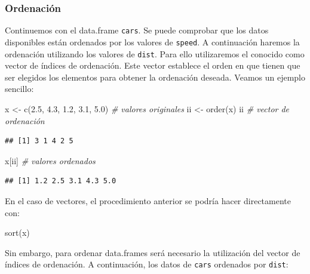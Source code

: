 \documentclass[
]{book}
\newenvironment{Shaded}{\begin{snugshade}}{\end{snugshade}}
\newcommand{\CommentTok}[1]{\textcolor[rgb]{0.56,0.35,0.01}{\textit{#1}}}
\newcommand{\FloatTok}[1]{\textcolor[rgb]{0.00,0.00,0.81}{#1}}
\newcommand{\FunctionTok}[1]{\textcolor[rgb]{0.00,0.00,0.00}{#1}}
\newcommand{\NormalTok}[1]{#1}
\newcommand{\OtherTok}[1]{\textcolor[rgb]{0.56,0.35,0.01}{#1}}
\theoremstyle{break}
\theoremstyle{nonumberplain}
\begin{document}
\hypertarget{ordenaciuxf3n}{%
\subsubsection{Ordenación}\label{ordenaciuxf3n}}

Continuemos con el data.frame \texttt{cars}.
Se puede comprobar que los datos disponibles están ordenados por
los valores de \texttt{speed}. A continuación haremos la ordenación utilizando
los valores de \texttt{dist}. Para ello utilizaremos el conocido como vector de
índices de ordenación.
Este vector establece el orden en que tienen que ser elegidos los
elementos para obtener la ordenación deseada.
Veamos un ejemplo sencillo:

\begin{Shaded}
\begin{Highlighting}[]
\NormalTok{x }\OtherTok{\textless{}{-}} \FunctionTok{c}\NormalTok{(}\FloatTok{2.5}\NormalTok{, }\FloatTok{4.3}\NormalTok{, }\FloatTok{1.2}\NormalTok{, }\FloatTok{3.1}\NormalTok{, }\FloatTok{5.0}\NormalTok{) }\CommentTok{\# valores originales}
\NormalTok{ii }\OtherTok{\textless{}{-}} \FunctionTok{order}\NormalTok{(x)}
\NormalTok{ii    }\CommentTok{\# vector de ordenación}
\end{Highlighting}
\end{Shaded}

\begin{verbatim}
## [1] 3 1 4 2 5
\end{verbatim}

\begin{Shaded}
\begin{Highlighting}[]
\NormalTok{x[ii] }\CommentTok{\# valores ordenados}
\end{Highlighting}
\end{Shaded}

\begin{verbatim}
## [1] 1.2 2.5 3.1 4.3 5.0
\end{verbatim}

En el caso de vectores, el procedimiento anterior se podría
hacer directamente con:

\begin{Shaded}
\begin{Highlighting}[]
\FunctionTok{sort}\NormalTok{(x)}
\end{Highlighting}
\end{Shaded}

Sin embargo, para ordenar data.frames será necesario la utilización del
vector de índices de ordenación. A continuación, los datos de \texttt{cars}
ordenados por \texttt{dist}:
\end{document}
